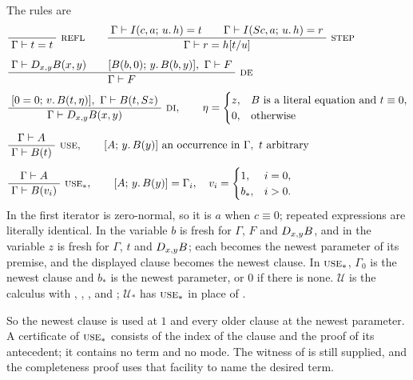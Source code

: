 \begin{definition}
\label{disch:def:spec}
The rules are
\begin{align}
 &\infrule{}{\Gamma\proves t=t}\ \rulename{Refl}
 \qquad
 \infrule{\Gamma\proves\It{c}{a}{u}{h}=t\qquad
          \Gamma\proves\It{\Suc c}{a}{u}{h}=r}
         {\Gamma\proves r=h\subst{t}{u}}\ \rulename{Step}
 \label{disch:eq:step}\\[1ex]
 &\infrule{\Gamma\proves\D{x}{y}B(x,y)\qquad
           [B(b,0);\,y.\,B(b,y)],\ \Gamma\proves F}
          {\Gamma\proves F}\ \rulename{DE}
 \notag\\[1ex]
 &\infrule{[0=0;\,v.\,B(t,\eta)],\ \Gamma\proves B(t,\Suc z)}
          {\Gamma\proves\D{x}{y}B(x,y)}\ \rulename{DI},
 \qquad
 \eta=\begin{cases}
 z,&B\text{ is a literal equation and }t\equiv 0,\\
 0,&\text{otherwise}
 \end{cases}
 \notag\\[1ex]
 &\infrule{\Gamma\proves A}{\Gamma\proves B(t)}\ \rulename{Use},
 \qquad [A;\,y.\,B(y)]\text{ an occurrence in }\Gamma,\ t\text{ arbitrary}
 \notag\\[1ex]
 &\infrule{\Gamma\proves A}{\Gamma\proves B(v_i)}\ \rulename{Use}_*,
 \qquad [A;\,y.\,B(y)]=\Gamma_i,\quad
 v_i=\begin{cases}1,&i=0,\\ b_*,&i>0.\end{cases}
 \label{disch:eq:usestar}
\end{align}
In  the first iterator is zero-normal, so it is $a$ when
$c\equiv 0$; repeated expressions are literally identical. In
 the variable $b$ is fresh for $\Gamma$, $F$ and
$D_{x,y}B$, and in  the variable $z$ is fresh for $\Gamma$,
$t$ and $D_{x,y}B$; each becomes the newest parameter of its premise, and
the displayed clause becomes the newest clause. In $\rulename{Use}_*$,
$\Gamma_0$ is the newest clause and $b_*$ is the newest parameter, or $0$
if there is none. $\mathcal U$ is the calculus with ,
, ,  and ;
$\mathcal U_*$ has $\rulename{Use}_*$ in place of .
\end{definition}

So the newest clause is used at $1$ and every older clause at the newest
parameter. A certificate of $\rulename{Use}_*$ consists of the index of
the clause and the proof of its antecedent; it contains no term and no
mode. The witness of  is still supplied, and the completeness
proof uses that facility to name the desired term.

